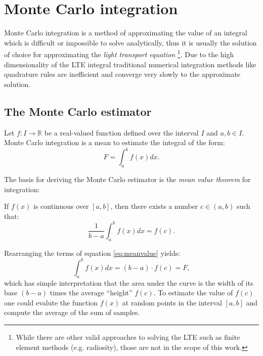 \chapter{Monte Carlo integration}
\label{ch:montecarlo}
Monte Carlo integration is a method of approximating the value of an integral which is difficult or impossible to solve analytically, thus it is usually the solution of choice for approximating the \emph{light transport equation} \footnote{While there are other valid approaches to solving the LTE such as finite element methods (e.g. radiosity), those are not in the scope of this work.}. Due to the high dimensionality of the LTE integral traditional numerical integration methods like quadrature rules are inefficient and converge very slowly to the approximate solution.

\section{The Monte Carlo estimator}
Let $f: I \rightarrow \mathbb{R}$ be a real-valued function defined over the interval $I$ and $a,b \in I$. Monte Carlo integration is a mean to estimate the integral of the form:
\begin{equation}
  F = \int_{a}^{b} f(x)dx.
\end{equation}

The basis for deriving the Monte Carlo estimator is the \emph{mean value theorem} for integration:
\begin{thm}
If $f(x)$ is continuous over $[a, b]$, then there exists a number $c \in (a, b)$ such that:
\begin{equation}
\label{eq:meanvalue}
  \frac{1}{b-a} \int_{a}^{b} f(x)dx = f(c).
\end{equation}
\end{thm}
Rearranging the terms of equation \ref{eq:meanvalue} yields:
\begin{equation}
  \int_{a}^{b} f(x)dx = (b-a) \cdot f(c) = F,
\end{equation}
which has simple interpretation that the area under the curve is the width of its base $(b-a)$ times the average ``height'' $f(c)$. To estimate the value of $f(c)$ one could evalute the function $f(x)$ at random points in the interval $[a,b]$ and compute the average of the sum of samples.

